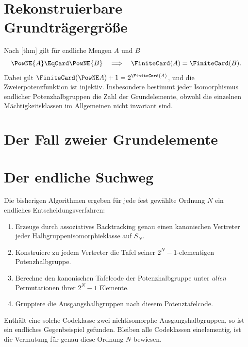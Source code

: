 \documentclass[main.tex]{subfiles}
\begin{document}
\section{Rekonstruierbare Grundträgergröße}

Nach
[thm]
gilt für endliche Mengen \(A\) und \(B\)
\[
  \PowNE{A}\EqCard\PowNE{B}
  \quad\Longrightarrow\quad
  \FiniteCard(A)=\FiniteCard(B).
\]
Dabei gilt
\(\FiniteCard(\PowNE A)+1=2^{\FiniteCard(A)}\), und die
Zweierpotenzfunktion ist injektiv.  Insbesondere bestimmt jeder Isomorphismus endlicher
Potenzhalbgruppen die Zahl der Grundelemente, obwohl die einzelnen
Mächtigkeitsklassen im Allgemeinen nicht invariant sind.

\section{Der Fall zweier Grundelemente}



\section{Der endliche Suchweg}

Die bisherigen Algorithmen ergeben für jede fest gewählte Ordnung \(N\) ein
endliches Entscheidungsverfahren:
\begin{enumerate}
  \item Erzeuge durch assoziatives Backtracking genau einen kanonischen
    Vertreter jeder Halbgruppenisomorphieklasse auf \(S_N\).
  \item Konstruiere zu jedem Vertreter die Tafel seiner
    \(2^N-1\)-elementigen Potenzhalbgruppe.
  \item Berechne den kanonischen Tafelcode der Potenzhalbgruppe unter
    \emph{allen} Permutationen ihrer \(2^N-1\) Elemente.
  \item Gruppiere die Ausgangshalbgruppen nach diesem Potenztafelcode.
\end{enumerate}
Enthält eine solche Codeklasse zwei nichtisomorphe Ausgangshalbgruppen, so ist
ein endliches Gegenbeispiel gefunden.  Bleiben alle Codeklassen einelementig,
ist die Vermutung für genau diese Ordnung \(N\) bewiesen.
\end{document}
